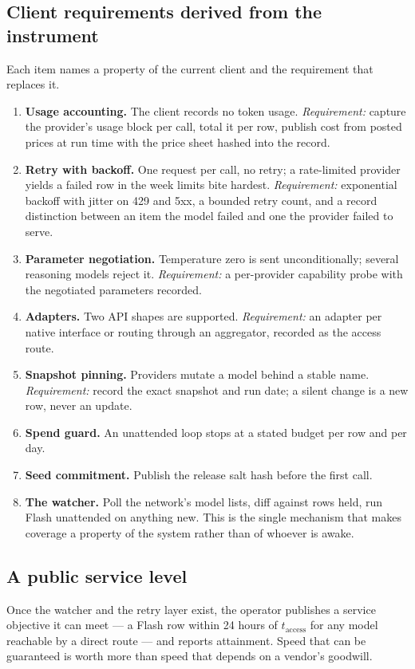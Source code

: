 \subsection{Client requirements derived from the instrument}
Each item names a property of the current client and the requirement that replaces it.
\begin{enumerate}[leftmargin=1.6em,itemsep=1pt]
\item \textbf{Usage accounting.} The client records no token usage. \emph{Requirement:} capture the provider's usage block per call, total it per row, publish cost from posted prices at run time with the price sheet hashed into the record.
\item \textbf{Retry with backoff.} One request per call, no retry; a rate-limited provider yields a failed row in the week limits bite hardest. \emph{Requirement:} exponential backoff with jitter on 429 and 5xx, a bounded retry count, and a record distinction between an item the model failed and one the provider failed to serve.
\item \textbf{Parameter negotiation.} Temperature zero is sent unconditionally; several reasoning models reject it. \emph{Requirement:} a per-provider capability probe with the negotiated parameters recorded.
\item \textbf{Adapters.} Two API shapes are supported. \emph{Requirement:} an adapter per native interface or routing through an aggregator, recorded as the access route.
\item \textbf{Snapshot pinning.} Providers mutate a model behind a stable name. \emph{Requirement:} record the exact snapshot and run date; a silent change is a new row, never an update.
\item \textbf{Spend guard.} An unattended loop stops at a stated budget per row and per day.
\item \textbf{Seed commitment.} Publish the release salt hash before the first call.
\item \textbf{The watcher.} Poll the network's model lists, diff against rows held, run Flash unattended on anything new. This is the single mechanism that makes coverage a property of the system rather than of whoever is awake.
\end{enumerate}

\subsection{A public service level}
Once the watcher and the retry layer exist, the operator publishes a service objective it can meet --- a Flash row within 24 hours of $t_{\text{access}}$ for any model reachable by a direct route --- and reports attainment. Speed that can be guaranteed is worth more than speed that depends on a vendor's goodwill.

